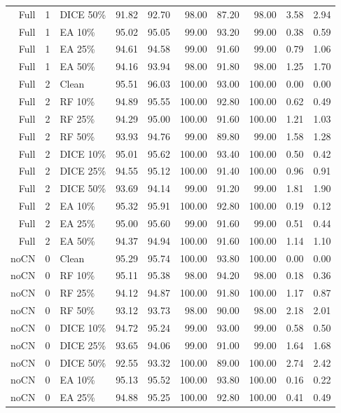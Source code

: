 {\begin{longtable}{rllrrrrrrr}
Full & 1 & DICE 50\% & 91.82 & 92.70 & 98.00 & 87.20 & 98.00 & 3.58 & 2.94 \\
Full & 1 & EA 10\% & 95.02 & 95.05 & 99.00 & 93.20 & 99.00 & 0.38 & 0.59 \\
Full & 1 & EA 25\% & 94.61 & 94.58 & 99.00 & 91.60 & 99.00 & 0.79 & 1.06 \\
Full & 1 & EA 50\% & 94.16 & 93.94 & 98.00 & 91.80 & 98.00 & 1.25 & 1.70 \\
Full & 2 & Clean & 95.51 & 96.03 & 100.00 & 93.00 & 100.00 & 0.00 & 0.00 \\
Full & 2 & RF 10\% & 94.89 & 95.55 & 100.00 & 92.80 & 100.00 & 0.62 & 0.49 \\
Full & 2 & RF 25\% & 94.29 & 95.00 & 100.00 & 91.60 & 100.00 & 1.21 & 1.03 \\
Full & 2 & RF 50\% & 93.93 & 94.76 & 99.00 & 89.80 & 99.00 & 1.58 & 1.28 \\
Full & 2 & DICE 10\% & 95.01 & 95.62 & 100.00 & 93.40 & 100.00 & 0.50 & 0.42 \\
Full & 2 & DICE 25\% & 94.55 & 95.12 & 100.00 & 91.40 & 100.00 & 0.96 & 0.91 \\
Full & 2 & DICE 50\% & 93.69 & 94.14 & 99.00 & 91.20 & 99.00 & 1.81 & 1.90 \\
Full & 2 & EA 10\% & 95.32 & 95.91 & 100.00 & 92.80 & 100.00 & 0.19 & 0.12 \\
Full & 2 & EA 25\% & 95.00 & 95.60 & 99.00 & 91.60 & 99.00 & 0.51 & 0.44 \\
Full & 2 & EA 50\% & 94.37 & 94.94 & 100.00 & 91.60 & 100.00 & 1.14 & 1.10 \\
noCN & 0 & Clean & 95.29 & 95.74 & 100.00 & 93.80 & 100.00 & 0.00 & 0.00 \\
noCN & 0 & RF 10\% & 95.11 & 95.38 & 98.00 & 94.20 & 98.00 & 0.18 & 0.36 \\
noCN & 0 & RF 25\% & 94.12 & 94.87 & 100.00 & 91.80 & 100.00 & 1.17 & 0.87 \\
noCN & 0 & RF 50\% & 93.12 & 93.73 & 98.00 & 90.00 & 98.00 & 2.18 & 2.01 \\
noCN & 0 & DICE 10\% & 94.72 & 95.24 & 99.00 & 93.00 & 99.00 & 0.58 & 0.50 \\
noCN & 0 & DICE 25\% & 93.65 & 94.06 & 99.00 & 91.00 & 99.00 & 1.64 & 1.68 \\
noCN & 0 & DICE 50\% & 92.55 & 93.32 & 100.00 & 89.00 & 100.00 & 2.74 & 2.42 \\
noCN & 0 & EA 10\% & 95.13 & 95.52 & 100.00 & 93.80 & 100.00 & 0.16 & 0.22 \\
noCN & 0 & EA 25\% & 94.88 & 95.25 & 100.00 & 92.80 & 100.00 & 0.41 & 0.49 \\

\end{longtable}}

